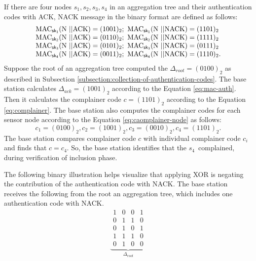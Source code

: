 		\begin{exmp} 
			If there are four nodes ${s_{1},s_{2},s_{3},s_{4}}$ in an aggregation tree and their authentication codes with ACK, NACK message in the binary format are defined as follows:
			\begin{equation*}
				\begin{array}{l}
					\mbox{MAC}_{\sf{sk}_{1}}(\mbox{N}\ || \mbox{ACK}) = (1001)_{2};\ \mbox{MAC}_{\sf{sk}_{1}}(\mbox{N}\ || \mbox{NACK}) = (1101)_{2}\\
					\mbox{MAC}_{\sf{sk}_{2}}(\mbox{N}\ || \mbox{ACK}) = (0110)_{2};\ \mbox{MAC}_{\sf{sk}_{2}}(\mbox{N}\ || \mbox{NACK}) = (1111)_{2}\\	
					\mbox{MAC}_{\sf{sk}_{3}}(\mbox{N}\ || \mbox{ACK}) = (0101)_{2};\ \mbox{MAC}_{\sf{sk}_{3}}(\mbox{N}\ || \mbox{NACK}) = (0111)_{2}\\
					\mbox{MAC}_{\sf{sk}_{4}}(\mbox{N}\ || \mbox{ACK}) = (0011)_{2};\ \mbox{MAC}_{\sf{sk}_{4}}(\mbox{N}\ || \mbox{NACK}) = (1110)_{2}.
				\end{array}
			\end{equation*}
			Suppose the root of an aggregation tree computed the $\Delta_{root} = (0100)_{2}$ as described in Subsection \ref{subsection:collection-of-authentication-codes}.
			The base station calculates $\Delta_{ack} = (1001)_{2}$ according to the Equation \ref{eq:mac-auth}.
			Then it calculates the complainer code $c = (1101)_{2}$ according to the Equation \ref{eq:complainer}.
			The base station also computes the complainer codes for each sensor node according to the Equation \ref{eq:caomplainer-node} as follows:
			\begin{equation*}			
				c_{1} = (0100)_{2}, c_{2} = (1001)_{2}, c_{3} = (0010)_{2}, c_{4} = (1101)_{2}.
			\end{equation*}
			The base station compares complainer code $c$ with individual complainer code $c_{i}$ and finds that $c=c_{4}$.
			So, the base station identifies that the $s_{4}$\ complained, during verification of inclusion phase.
		\end{exmp}
		The following binary illustration helps visualize that applying XOR is negating the contribution of the authentication code with NACK.
		The base station receives the following from the root an aggregation tree, which includes one authentication code with NACK.
		\[
			\underbrace{			
				\begin{array}{cccc}
					1 & 0 & 0 & 1 \\ 
					0 & 1 & 1 & 0 \\
					0 & 1 & 0 & 1 \\
					1 & 1 & 1 & 0 \\
					\hline
					0 & 1 & 0 & 0 
				\end{array}
				}_{\Delta_{root}}
		\]
